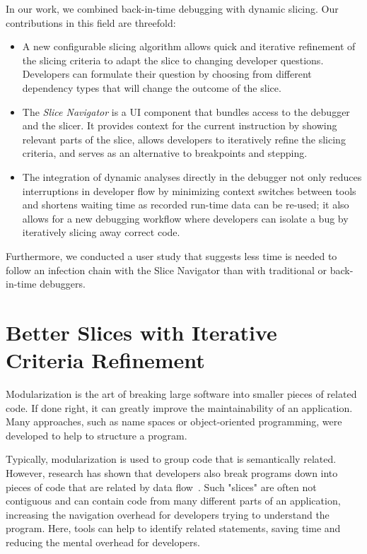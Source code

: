 In our work, we combined back-in-time debugging with dynamic slicing.
Our contributions in this field are threefold:
\begin{itemize}
	\item A new configurable slicing algorithm allows quick and iterative refinement of the slicing criteria to adapt the slice to changing developer questions.
	Developers can formulate their question by choosing from different dependency types that will change the outcome of the slice.
	\item The \emph{Slice Navigator} is a UI component that bundles access to the debugger and the slicer.
		It provides context for the current instruction by showing relevant parts of the slice, allows developers to iteratively refine the slicing criteria, and serves as an alternative to breakpoints and stepping.
	\item The integration of dynamic analyses directly in the debugger not only reduces interruptions in developer flow by minimizing context switches between tools and shortens waiting time as recorded run-time data can be re-used; it also allows for a new debugging workflow where developers can isolate a bug by iteratively slicing away correct code.
\end{itemize}
Furthermore, we conducted a user study that suggests less time is needed to follow an infection chain with the Slice Navigator than with traditional or back-in-time debuggers.

\section{Better Slices with Iterative Criteria Refinement}

Modularization is the art of breaking large software into smaller pieces of related code.
If done right, it can greatly improve the maintainability of an application.
Many approaches, such as name spaces or object-oriented programming, were developed to help to structure a program.

Typically, modularization is used to group code that is semantically related.
However, research has shown that developers also break programs down into pieces of code that are related by data flow~\cite{weiser82:programmers_use_slices_when}.
Such "slices" are often not contiguous and can contain code from many different parts of an application, increasing the navigation overhead for developers trying to understand the program.
Here, tools can help to identify related statements, saving time and reducing the mental overhead for developers.

